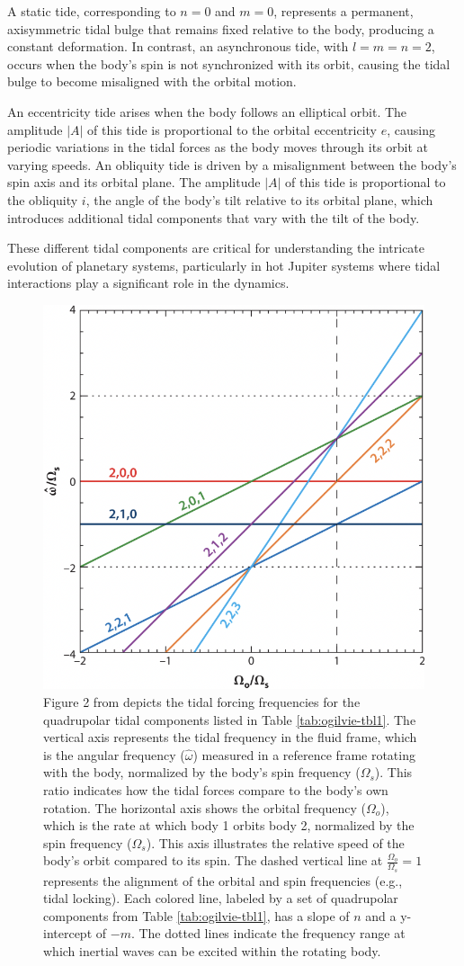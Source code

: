 \documentclass[oneside,12pt]{amsart}
\numberwithin{page}{section}
\begin{document}
A static tide, corresponding to $n=0$ and $m=0$, represents a permanent, axisymmetric tidal bulge that remains fixed relative to the body, producing a constant deformation. In contrast, an asynchronous tide, with $l=m=n=2$, occurs when the body’s spin is not synchronized with its orbit, causing the tidal bulge to become misaligned with the orbital motion.

An eccentricity tide arises when the body follows an elliptical orbit. The amplitude $|A|$ of this tide is proportional to the orbital eccentricity $e$, causing periodic variations in the tidal forces as the body moves through its orbit at varying speeds. An obliquity tide is driven by a misalignment between the body’s spin axis and its orbital plane. The amplitude $|A|$ of this tide is proportional to the obliquity $i$, the angle of the body's tilt relative to its orbital plane, which introduces additional tidal components that vary with the tilt of the body.

These different tidal components are critical for understanding the intricate evolution of planetary systems, particularly in hot Jupiter systems where tidal interactions play a significant role in the dynamics.

\begin{figure}[htbp]
    \centering
    \includegraphics[width=0.5\linewidth]{figs/ogilvie_fig2.png}
    \caption{Figure 2 from \citet{ogilvie2014tidal} depicts the tidal forcing frequencies for the quadrupolar tidal components listed in Table \ref{tab:ogilvie-tbl1}. The vertical axis represents the tidal frequency in the fluid frame, which is the angular frequency ($\hat{\omega}$) measured in a reference frame rotating with the body, normalized by the body’s spin frequency ($\Omega_s$). This ratio indicates how the tidal forces compare to the body’s own rotation. The horizontal axis shows the orbital frequency ($\Omega_o$), which is the rate at which body 1 orbits body 2, normalized by the spin frequency ($\Omega_s$). This axis illustrates the relative speed of the body’s orbit compared to its spin. The dashed vertical line at $\frac{\Omega_o}{\Omega_s} = 1$ represents the alignment of the orbital and spin frequencies (e.g., tidal locking). Each colored line, labeled by a set of quadrupolar components from Table \ref{tab:ogilvie-tbl1}, has a slope of $n$ and a y-intercept of $-m$. The dotted lines indicate the frequency range at which inertial waves can be excited within the rotating body.}
    \label{fig:ogilvie-fig2}
\end{figure}
\end{document}
